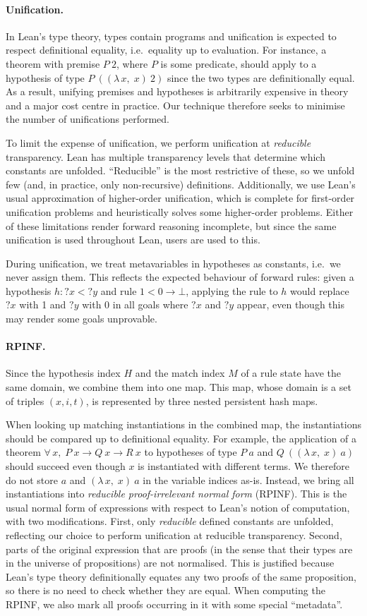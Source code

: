 \documentclass[runningheads,leqno]{llncs}
\newcommand{\para}[1]{\paragraph{\bfseries\upshape #1}}
\newcommand{\Lam}[2]{\ensuremath{\lambda\, #1,\; #2}}
\newcommand{\All}[2]{\ensuremath{\forall\, #1,\; #2}}
\newcommand{\mvar}[1]{\ensuremath{?#1}}
\begin{document}
\para{Unification.}
In Lean's type theory, types contain programs and unification is expected to respect definitional equality, i.e.\ equality up to evaluation.
For instance, a theorem with premise $P~2$, where $P$ is some predicate, should apply to a hypothesis of type $P~((\Lam{x}{x})~2)$ since the two types are definitionally equal.
As a result, unifying premises and hypotheses is arbitrarily expensive in theory and a major cost centre in practice.
Our technique therefore seeks to minimise the number of unifications performed.

To limit the expense of unification, we perform unification at \emph{reducible} transparency.
Lean has multiple transparency levels that determine which constants are unfolded.
\enquote{Reducible} is the most restrictive of these, so we unfold few (and, in practice, only non-recursive) definitions.
Additionally, we use Lean's usual approximation of higher-order unification, which is complete for first-order unification problems and heuristically solves some higher-order problems.
Either of these limitations render forward reasoning incomplete, but since the same unification is used throughout Lean, users are used to this.

During unification, we treat metavariables in hypotheses as constants, i.e.\ we never assign them.
This reflects the expected behaviour of forward rules: given a hypothesis $h : \mvar{x} < \mvar{y}$ and rule $1 < 0 → ⊥$, applying the rule to $h$ would replace $\mvar{x}$ with 1 and $\mvar{y}$ with 0 in all goals where $\mvar{x}$ and $\mvar{y}$ appear, even though this may render some goals unprovable.

\para{RPINF.}
Since the hypothesis index $H$ and the match index $M$ of a rule state have the same domain, we combine them into one map.
This map, whose domain is a set of triples $(x, i, t)$, is represented by three nested persistent hash maps.

When looking up matching instantiations in the combined map, the instantiations should be compared up to definitional equality.
For example, the application of a theorem $\All{x}{P~x → Q~x → R~x}$ to hypotheses of type $P~a$ and $Q~((\Lam{x}{x})~a)$ should succeed even though $x$ is instantiated with different terms.
We therefore do not store $a$ and $(\Lam{x}{x})~a$ in the variable indices as-is.
Instead, we bring all instantiations into \emph{reducible proof-irrelevant normal form} (RPINF).
This is the usual normal form of expressions with respect to Lean's notion of computation, with two modifications.
First, only \emph{reducible} defined constants are unfolded, reflecting our choice to perform unification at reducible transparency.
Second, parts of the original expression that are proofs (in the sense that their types are in the universe of propositions) are not normalised.
This is justified because Lean's type theory definitionally equates any two proofs of the same proposition, so there is no need to check whether they are equal.
When computing the RPINF, we also mark all proofs occurring in it with some special \enquote{metadata}.
\end{document}
